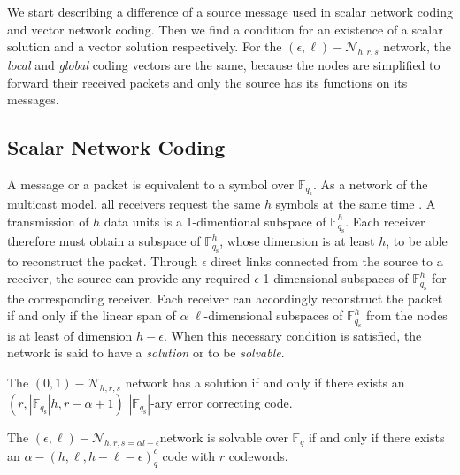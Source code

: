 We start describing a difference of a source message used in scalar
network coding and vector network coding. Then we find a condition
for an existence of a scalar solution and a vector solution respectively.
For the $(\epsilon,\ell)-\mathcal{N}_{h,r,s}$ network, the \textit{local}
and \textit{global} coding vectors are the same, because the nodes
are simplified to forward their received packets and only the source
has its functions on its messages.

\subsection{Scalar Network Coding \label{subsec:Scalar-network-coding}}

A message or a packet is equivalent to a symbol over $\ensuremath{\mathbb{F}}_{q_{\mathrm{s}}}$.
As a network of the multicast model, all receivers request the same
$h$ symbols at the same time \cite{Trautmann:2013}. A transmission
of $h$ data units is a 1-dimentional subspace of $\ensuremath{\mathbb{F}}_{q_{\mathrm{s}}}^{h}$.
Each receiver therefore must obtain a subspace of $\ensuremath{\mathbb{F}}_{q_{\mathrm{s}}}^{h}$,
whose dimension is at least $h$, to be able to reconstruct the packet.
Through $\epsilon$ direct links connected from the source to a receiver,
the source can provide any required $\epsilon$ 1-dimensional subspaces
of $\ensuremath{\mathbb{F}}_{q_{\mathrm{s}}}^{h}$ for the corresponding
receiver. Each receiver can accordingly reconstruct the packet if
and only if the linear span of $\alpha$ $\ell$-dimensional subspaces
of $\ensuremath{\mathbb{F}}_{q_{\mathrm{s}}}^{h}$ from the nodes
is at least of dimension $h-\epsilon$. When this necessary condition
is satisfied, the network is said to have a \textit{solution} or to
be \textit{solvable}.
\begin{thm}
 The $(0,1)-\mathcal{N}_{h,r,s}$ network has a solution if and only
if there exists an $\left(r,\left|\ensuremath{\mathbb{F}}_{q_{\mathrm{s}}}\right|h,r-\alpha+1\right)$
$\left|\ensuremath{\mathbb{F}}_{q_{\mathrm{s}}}\right|$-ary error
correcting code. 
\end{thm}
%
\begin{thm}
 The $(\epsilon,\ell)-\mathcal{N}_{h,r,s=\alpha l+\epsilon}$network
is solvable over $\ensuremath{\mathbb{F}}_{q}$ if and only if there
exists an $\alpha-\left(h,\ell,h-\ell-\epsilon\right)_{q}^{c}$ code
with $r$ codewords. \label{theo:scalar_sol_exist}
\end{thm}

